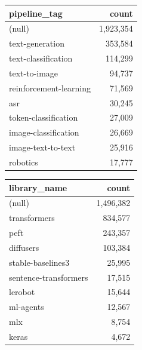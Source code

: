 \documentclass[11pt]{article}
\begin{document}
\begin{table}[H]
\centering
\begin{minipage}[t]{0.48\textwidth}
\centering\small
\begin{tabular}{lr}
\toprule
\textbf{pipeline\_tag} & \textbf{count} \\
\midrule
(null)                       & 1,923,354 \\
text-generation              & 353,584 \\
text-classification          & 114,299 \\
text-to-image                & 94,737 \\
reinforcement-learning       & 71,569 \\
asr                          & 30,245 \\
token-classification         & 27,009 \\
image-classification         & 26,669 \\
image-text-to-text           & 25,916 \\
robotics                     & 17,777 \\
\bottomrule
\end{tabular}
\end{minipage}
\hfill
\begin{minipage}[t]{0.48\textwidth}
\centering\small
\begin{tabular}{lr}
\toprule
\textbf{library\_name} & \textbf{count} \\
\midrule
(null)                & 1,496,382 \\
transformers          & 834,577 \\
peft                  & 243,357 \\
diffusers             & 103,384 \\
stable-baselines3     & 25,995 \\
sentence-transformers & 17,515 \\
lerobot               & 15,644 \\
ml-agents             & 12,567 \\
mlx                   & 8,754 \\
keras                 & 4,672 \\
\bottomrule
\end{tabular}
\end{minipage}
\end{table}
\end{document}
